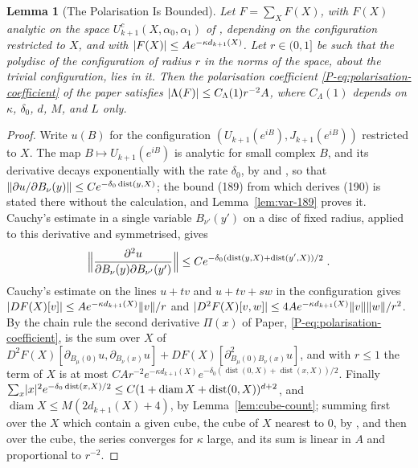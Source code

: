 \documentclass[11pt]{preprint}
\newcommand{\diam}{\operatorname{diam}}
\newcommand{\dist}{\operatorname{dist}}
\DeclarePairedDelimiter{\abs}{\lvert}{\rvert}
\DeclarePairedDelimiter{\norm}{\lVert}{\rVert}
\numberwithin{equation}{section}
\newtheorem{lemma}{Lemma}[section]
\theoremstyle{definition}
\theoremstyle{remark}
\theoremstyle{plain}
\begin{document}
\begin{lemma}[The Polarisation Is Bounded]\label{lem:polarisation-bounded}
Let $F = \sum_XF(X)$, with $F(X)$ analytic on the space $U^c_{k+1}(X, \alpha_0, \alpha_1)$ of \cite[(1.10)--(1.16), p.~262]{BalabanRG1}, depending on the configuration restricted to $X$, and with $\abs{F(X)} \leq Ae^{-\kappa d_{k+1}(X)}$. Let $r \in (0, 1]$ be such that the polydisc of the configuration of radius $r$ in the norms of the space, about the trivial configuration, lies in it. Then the polarisation coefficient \eqref{P-eq:polarisation-coefficient} of the paper satisfies $\abs{\Lambda(F)} \leq C_\Lambda(1)r^{-2}A$, where $C_\Lambda(1)$ depends on $\kappa$, $\delta_0$, $d$, $M$, and $L$ only.
\end{lemma}

\begin{proof}
Write $u(B)$ for the configuration $(U_{k+1}(e^{iB}), J_{k+1}(e^{iB}))$ restricted to $X$. The map $B \mapsto U_{k+1}(e^{iB})$ is analytic for small complex $B$, and its derivative decays exponentially with the rate $\delta_0$, by \cite[Proposition~9, p.~309]{BalabanVAR} and \cite[(190), p.~308]{BalabanVAR}, so that $\norm{\partial u/\partial B_\nu(y)} \leq Ce^{-\delta_0\dist(y, X)}$; the bound (189) from which \cite[p.~308]{BalabanVAR} derives (190) is stated there without the calculation, and Lemma~\ref{lem:var-189} proves it. Cauchy's estimate in a single variable $B_{\nu'}(y')$ on a disc of fixed radius, applied to this derivative and symmetrised, gives
\begin{equation}\label{eq:second-derivative-background}
    \Bigl\lVert\frac{\partial^2u}{\partial B_\nu(y)\partial B_{\nu'}(y')}\Bigr\rVert \leq Ce^{-\delta_0(\dist(y, X) + \dist(y', X))/2}\;.
\end{equation}
Cauchy's estimate on the lines $u + tv$ and $u + tv + sw$ in the configuration gives $\abs{DF(X)[v]} \leq Ae^{-\kappa d_{k+1}(X)}\norm{v}/r$ and $\abs{D^2F(X)[v, w]} \leq 4Ae^{-\kappa d_{k+1}(X)}\norm{v}\norm{w}/r^2$. By the chain rule the second derivative $\Pi(x)$ of Paper, \eqref{P-eq:polarisation-coefficient}, is the sum over $X$ of $D^2F(X)[\partial_{B_\mu(0)}u, \partial_{B_\nu(x)}u] + DF(X)[\partial^2_{B_\mu(0)B_\nu(x)}u]$, and with $r \leq 1$ the term of $X$ is at most $CAr^{-2}e^{-\kappa d_{k+1}(X)}e^{-\delta_0(\dist(0, X) + \dist(x, X))/2}$. Finally $\sum_x\abs{x}^2e^{-\delta_0\dist(x, X)/2} \leq C(1 + \diam X + \dist(0, X))^{d+2}$, and $\diam X \leq M(2d_{k+1}(X) + 4)$, by Lemma~\ref{lem:cube-count}; summing first over the $X$ which contain a given cube, the cube of $X$ nearest to $0$, by \cite[(1.26), p.~8]{BalabanRG2}, and then over the cube, the series converges for $\kappa$ large, and its sum is linear in $A$ and proportional to $r^{-2}$.
\end{proof}
\end{document}
